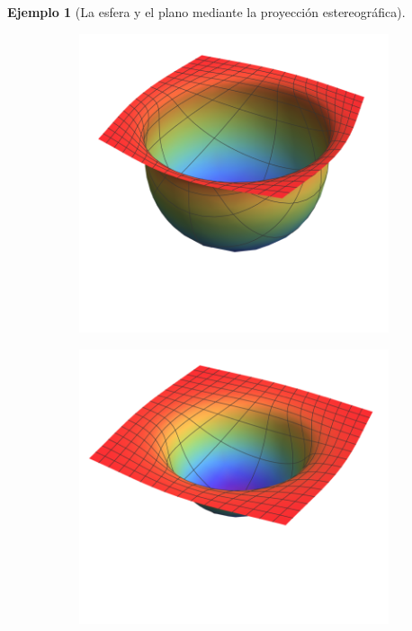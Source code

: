 \documentclass[spanish]{book}
\theoremstyle{definition}
\newtheorem*{ejem}{Ejemplo}
\begin{document}
\begin{ejem}[La esfera y el plano mediante la proyección estereográfica]
\begin{figure}[H]
\begin{subfigure}{.32\textwidth}
		\end{subfigure}
		\begin{subfigure}{.32\textwidth}
			\centering
			\includegraphics[width=\linewidth]{sup24}
		\end{subfigure}\vspace{.2cm}
		\begin{subfigure}{.25\textwidth}
			\centering
			\includegraphics[width=\linewidth]{sup25}

\end{subfigure}
\end{figure}
\end{ejem}
\end{document}
